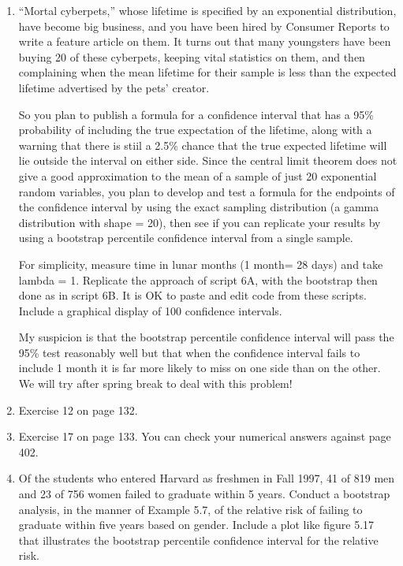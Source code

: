 \documentclass[12pt]{article}
\begin{document}
\begin{enumerate}
\item ``Mortal cyberpets,'' whose lifetime is specified by an exponential distribution, have become big business, and you have been hired by Consumer Reports to write a feature article on them. It turns out that many youngsters have been buying 20 of these cyberpets, keeping vital statistics on them, and then complaining when the mean lifetime for their sample is less than the expected lifetime advertised by the pets' creator.

So you plan to publish a formula for a confidence interval that has a 95\% probability of including the true expectation of the lifetime, along with a warning that there is stiil a 2.5\% chance that the true expected lifetime will lie outside the interval on either side. Since the central limit theorem does not give a good approximation to the mean of a sample of just 20 exponential random variables, you plan to develop and test a formula for the endpoints of the confidence interval by using the exact sampling distribution (a gamma distribution with shape = 20), then see if you can replicate your results by using a bootstrap percentile confidence interval from a single sample.

For simplicity, measure time in lunar months (1 month= 28 days)  and take lambda = 1. Replicate the approach of script 6A, with the bootstrap then done as in script 6B. It is OK to paste and edit code from these scripts. Include a graphical display of 100 confidence intervals.

My suspicion is that the bootstrap percentile confidence interval will pass the 95\% test reasonably well but that when the confidence interval fails to include 1 month it is far more likely to miss on one side than on the other. We will try after spring break to deal with this problem!

\item Exercise 12 on page 132.

\item Exercise 17 on page 133. You can check your numerical answers against page 402.

\item Of the students who entered Harvard as freshmen in Fall 1997, 41 of 819 men and 23 of 756 women failed to graduate within 5 years. Conduct a bootstrap analysis, in the manner of Example 5.7, of the relative risk of failing to graduate within five years based on gender. Include a plot like figure 5.17 that illustrates the bootstrap percentile confidence interval for the relative risk.


\end{enumerate}









\pagebreak
\end{document}
